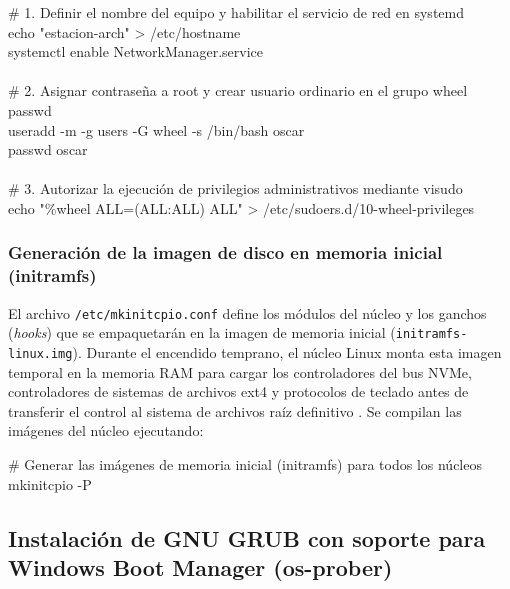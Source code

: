 \documentclass[12pt]{article}
\begin{document}
\begin{mdframed}[style=terminal]
\ttfamily\upshape\color{bashLetterColor}\footnotesize
\# 1. Definir el nombre del equipo y habilitar el servicio de red en systemd \\
echo "estacion-arch" > /etc/hostname \\
systemctl enable NetworkManager.service \\
\\
\# 2. Asignar contraseña a root y crear usuario ordinario en el grupo wheel \\
passwd \\
useradd -m -g users -G wheel -s /bin/bash oscar \\
passwd oscar \\
\\
\# 3. Autorizar la ejecución de privilegios administrativos mediante visudo \\
echo "\%wheel ALL=(ALL:ALL) ALL" > /etc/sudoers.d/10-wheel-privileges
\end{mdframed}

\subsubsection{Generación de la imagen de disco en memoria inicial (initramfs)}

El archivo \texttt{/etc/mkinitcpio.conf} define los módulos del núcleo y los ganchos (\textit{hooks}) que se empaquetarán en la imagen de memoria inicial (\texttt{initramfs-linux.img}). Durante el encendido temprano, el núcleo Linux monta esta imagen temporal en la memoria RAM para cargar los controladores del bus NVMe, controladores de sistemas de archivos ext4 y protocolos de teclado antes de transferir el control al sistema de archivos raíz definitivo \parencite[\S 2.4.3, pp.\ 76--77]{deitel2004operating}. Se compilan las imágenes del núcleo ejecutando:

\begin{mdframed}[style=terminal]
\ttfamily\upshape\color{bashLetterColor}\footnotesize
\# Generar las imágenes de memoria inicial (initramfs) para todos los núcleos \\
mkinitcpio -P
\end{mdframed}

\subsection{Instalación de GNU GRUB con soporte para Windows Boot Manager (os-prober)}
\label{sec:instalacionGrubOsProber}
\end{document}
